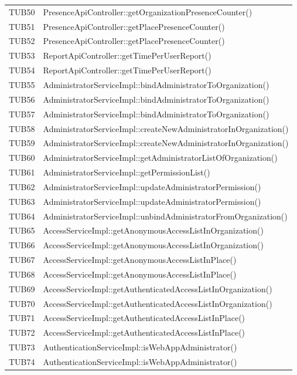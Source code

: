 {\begin{longtable}{C{2cm} C{8cm}}
TUB50 & PresenceApiController::getOrganizationPresenceCounter()\\
TUB51 & PresenceApiController::getPlacePresenceCounter()\\
TUB52 & PresenceApiController::getPlacePresenceCounter()\\
TUB53 & ReportApiController::getTimePerUserReport()\\
TUB54 & ReportApiController::getTimePerUserReport()\\
TUB55 & AdministratorServiceImpl::bindAdministratorToOrganization()\\
TUB56 & AdministratorServiceImpl::bindAdministratorToOrganization()\\
TUB57 & AdministratorServiceImpl::bindAdministratorToOrganization()\\
TUB58 & AdministratorServiceImpl::createNewAdministratorInOrganization()\\
TUB59 & AdministratorServiceImpl::createNewAdministratorInOrganization()\\
TUB60 & AdministratorServiceImpl::getAdministratorListOfOrganization()\\
TUB61 & AdministratorServiceImpl::getPermissionList()\\
TUB62 & AdministratorServiceImpl::updateAdministratorPermission()\\
TUB63 & AdministratorServiceImpl::updateAdministratorPermission()\\
TUB64 & AdministratorServiceImpl::unbindAdministratorFromOrganization()\\
TUB65 & AccessServiceImpl::getAnonymousAccessListInOrganization()\\
TUB66 & AccessServiceImpl::getAnonymousAccessListInOrganization()\\
TUB67 & AccessServiceImpl::getAnonymousAccessListInPlace()\\
TUB68 & AccessServiceImpl::getAnonymousAccessListInPlace()\\
TUB69 & AccessServiceImpl::getAuthenticatedAccessListInOrganization()\\
TUB70 & AccessServiceImpl::getAuthenticatedAccessListInOrganization()\\
TUB71 & AccessServiceImpl::getAuthenticatedAccessListInPlace()\\
TUB72 & AccessServiceImpl::getAuthenticatedAccessListInPlace()\\
TUB73 & AuthenticationServiceImpl::isWebAppAdministrator()\\
TUB74 & AuthenticationServiceImpl::isWebAppAdministrator()\\

\end{longtable}}

